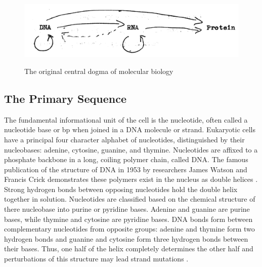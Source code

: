 \begin{figure}[b]
  \centering
  \caption{The original central dogma of molecular biology \citep{crick1970}}
  \includegraphics[width=\textwidth]{figures/biology/dogma}\label{fig:dogma}
\end{figure}

\subsection*{The Primary Sequence}

The fundamental informational unit of the cell is the \gls{nucleotide}, often called a nucleotide base or \gls{bp} when joined in a
\gls{DNA} molecule or strand.  Eukaryotic cells have a principal four character alphabet of nucleotides, distinguished by their \glspl{nucleobase}:
adenine, cytosine, guanine, and thymine.  Nucleotides are affixed to a phosphate backbone in a long, coiling polymer chain, called \gls{DNA}.  The
famous publication of the structure of \gls{DNA} in 1953 by researchers James Watson and Francis Crick demonstrates these polymers
exist in the nucleus as double helices \citep{watson1953}.  Strong hydrogen bonds between opposing nucleotides hold the double helix together
in solution.  Nucleotides are classified based on the chemical structure of there nucleobase into purine or pyridine bases.  Adenine and guanine are purine bases,
while thymine and cytosine are pyridine bases.  \gls{DNA} bonds form between complementary nucleotides from opposite groups: adenine and thymine form
two hydrogen bonds and guanine and cytosine form three hydrogen bonds between their bases.  Thus, one half of the helix completely
determines the other half and perturbations of this structure may lead strand mutations \citep{alberts2002,cox2008}.

